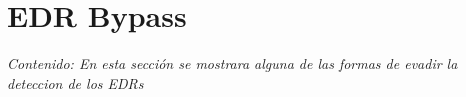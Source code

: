 \chapter{EDR Bypass}

\textit{Contenido: En esta sección se mostrara alguna de las formas de evadir 
la deteccion de los EDRs}
\vspace{1em}






